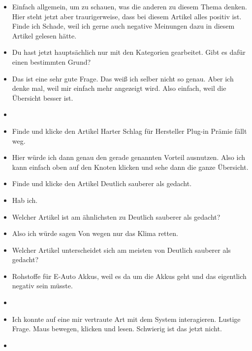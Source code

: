{\begin{itemize}[]
            \item {} Einfach allgemein, um zu schauen, was die anderen zu diesem Thema denken.
                  Hier steht jetzt aber traurigerweise, dass bei diesem Artikel alles positiv ist.
                  Finde ich Schade, weil ich gerne auch negative Meinungen dazu in diesem Artikel gelesen hätte.
            \item {} Du hast jetzt hauptsächlich nur mit den Kategorien gearbeitet.
                  Gibt es dafür einen bestimmten Grund?
            \item {} Das ist eine sehr gute Frage.
                  Das weiß ich selber nicht so genau.
                  Aber ich denke mal, weil mir einfach mehr angezeigt wird.
                  Also einfach, weil die Übersicht besser ist.
            \item {}
            \item {} Finde und klicke den Artikel \flqq Harter Schlag für Hersteller Plug-in Prämie fällt weg\frqq{}.
            \item {} Hier würde ich dann genau den gerade genannten Vorteil ausnutzen.
                  Also ich kann einfach oben auf den Knoten klicken und sehe dann die ganze Übersicht.
            \item {} Finde und klicke den Artikel \flqq Deutlich sauberer als gedacht\frqq{}.
            \item {} Hab ich.
            \item {} Welcher Artikel ist am ähnlichsten zu \flqq Deutlich sauberer als gedacht\frqq{}?
            \item {} Also ich würde sagen \flqq Von wegen nur das Klima retten\frqq{}.
            \item {} Welcher Artikel unterscheidet sich am meisten von \flqq Deutlich sauberer als gedacht\frqq{}?
            \item {} \flqq Rohstoffe für E-Auto Akkus\frqq{}, weil es da um die Akkus geht und das eigentlich negativ sein müsste.
            \item {}
            \item {} Ich konnte auf eine mir vertraute Art mit dem System interagieren.
                  Lustige Frage.
                  Maus bewegen, klicken und lesen.
                  Schwierig ist das jetzt nicht.
            \item {}

\end{itemize}}
